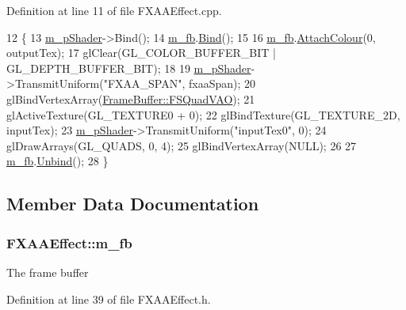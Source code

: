 Definition at line 11 of file F\+X\+A\+A\+Effect.\+cpp.


\begin{DoxyCode}
12 \{
13   \hyperlink{class_f_x_a_a_effect_ad80cc67deda40415c1944b6b6bad9895}{m\_pShader}->Bind();
14   \hyperlink{class_f_x_a_a_effect_a7bab788a74fa45f3383a99cd3c8f6425}{m\_fb}.\hyperlink{class_frame_buffer_ae7e61568475fba3b15e446c9061833ea}{Bind}();
15 
16   \hyperlink{class_f_x_a_a_effect_a7bab788a74fa45f3383a99cd3c8f6425}{m\_fb}.\hyperlink{class_frame_buffer_a1556417c0dec00d1d24bdf0e84bc4c4d}{AttachColour}(0, outputTex);
17   glClear(GL\_COLOR\_BUFFER\_BIT | GL\_DEPTH\_BUFFER\_BIT);
18   
19   \hyperlink{class_f_x_a_a_effect_ad80cc67deda40415c1944b6b6bad9895}{m\_pShader}->TransmitUniform(\textcolor{stringliteral}{"FXAA\_SPAN"}, fxaaSpan);
20   glBindVertexArray(\hyperlink{class_frame_buffer_a22b0c9de2bef06e0de865684556a6677}{FrameBuffer::FSQuadVAO});
21   glActiveTexture(GL\_TEXTURE0 + 0);
22   glBindTexture(GL\_TEXTURE\_2D, inputTex);
23   \hyperlink{class_f_x_a_a_effect_ad80cc67deda40415c1944b6b6bad9895}{m\_pShader}->TransmitUniform(\textcolor{stringliteral}{"inputTex0"}, 0);
24   glDrawArrays(GL\_QUADS, 0, 4);
25   glBindVertexArray(NULL);
26 
27   \hyperlink{class_f_x_a_a_effect_a7bab788a74fa45f3383a99cd3c8f6425}{m\_fb}.\hyperlink{class_frame_buffer_a1e114b325998ec4e4b9a9ea090d64ae8}{Unbind}();
28 \}
\end{DoxyCode}


\subsection{Member Data Documentation}
\subsubsection[{\texorpdfstring{m\+\_\+fb}{m_fb}}]{ F\+X\+A\+A\+Effect\+::m\+\_\+fb\hspace{0.3cm}{\ttfamily [private]}}\hypertarget{class_f_x_a_a_effect_a7bab788a74fa45f3383a99cd3c8f6425}{}\label{class_f_x_a_a_effect_a7bab788a74fa45f3383a99cd3c8f6425}


The frame buffer 



Definition at line 39 of file F\+X\+A\+A\+Effect.\+h.

